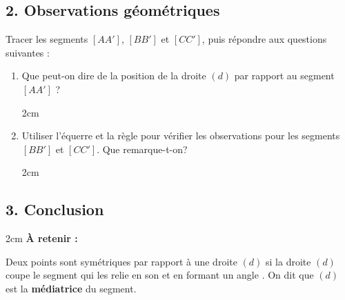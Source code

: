 \documentclass[a4paper]{book}
\begin{document}
\subsection*{2. Observations géométriques}
    
    Tracer les segments $[AA']$, $[BB']$ et $[CC']$, puis répondre aux questions suivantes :
    
    \begin{enumerate}
        \item Que peut-on dire de la position de la droite $(d)$ par rapport au segment $[AA']$ ?
        
        \begin{ZoneReponse}{2cm}
        \end{ZoneReponse} 
    
        \item Utiliser l'équerre et la règle pour vérifier les observations pour les segments $[BB']$ et $[CC']$. Que remarque-t-on?
        
        \begin{ZoneReponse}{2cm}
        \end{ZoneReponse} 
    \end{enumerate}
    
\subsection*{3. Conclusion}
    
    \begin{ZoneReponse}{2cm}
        \textbf{À retenir :} 
        
        Deux points sont symétriques par rapport à une droite $(d)$ si la droite $(d)$ coupe le segment qui les relie en son \points[10] et en formant un angle \points[10]. On dit que $(d)$ est la \textbf{médiatrice} du segment.
    \end{ZoneReponse}
\end{document}
